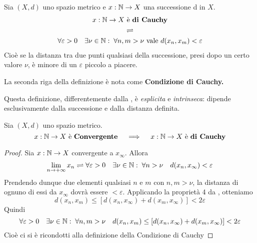 \begin{definition}
	\label{def:succ_cau}
	Sia $(X,d)$ uno spazio metrico e $x: \mathbb{N} \to X$ una successione d in $X$.
	\begin{gather*}
		x:\mathbb{N} \to X \text{ è \textbf{di Cauchy}}\\
		\rightleftharpoons\\
		\forall \varepsilon > 0\quad \exists \nu \in \mathbb{N}:\; \forall n,m > \nu \text{ vale } d(x_n, x_m) < \varepsilon
	\end{gather*}
	Cioè se la distanza tra due punti qualsiasi della successione, presi dopo un certo valore $\nu$, è minore di un $\varepsilon$ piccolo a piacere.
	\begin{note}
		La seconda riga della definizione è nota come \textbf{Condizione di Cauchy.}
	\end{note}
	\begin{note}
		Questa definizione, differentemente dalla , è \textit{esplicita} e \textit{intrinseca}: dipende esclusivamente dalla successione e dalla distanza definita.
	\end{note}
\end{definition}
\begin{proposition}
	\label{prop:se_succ_conv_allora_cau}
	Sia $(X,d)$ uno spazio metrico.
	\[x: \mathbb{N} \to X \text{ è \textbf{Convergente}} \quad \implies \quad x:\mathbb{N} \to X \text{ è \textbf{di Cauchy}}\]
	\begin{proof}
		Sia $x: \mathbb{N} \to X$ convergente a $x_\infty$. Allora
		\[\lim\limits_{n \to +\infty} x_n \rightleftharpoons \forall\varepsilon > 0 \quad \exists\nu\in\mathbb{N}:\; \forall n > \nu \quad d(x_n,x_\infty)<\varepsilon\]
		Prendendo dunque due elementi qualsiasi $n$ e $m$ con $n,m > \nu$, la distanza di ognuno di essi da $x_\infty$ dovrà essere $<\varepsilon$. Applicando la proprietà 4 da , otteniamo
		\[d(x_n,x_m) \leq \left[ d(x_n,x_\infty)+d(x_m,x_\infty) \right] < 2\varepsilon\]
		Quindi
		\[\forall\varepsilon > 0 \quad \exists\nu\in\mathbb{N}:\; \forall n,m > \nu \quad d(x_n,x_m) \leq \left[ d(x_n,x_\infty)+d(x_m,x_\infty) \right] < 2\varepsilon\]
		Cioè ci si è ricondotti alla definizione della Condizione di Cauchy
	\end{proof}
\end{proposition}

